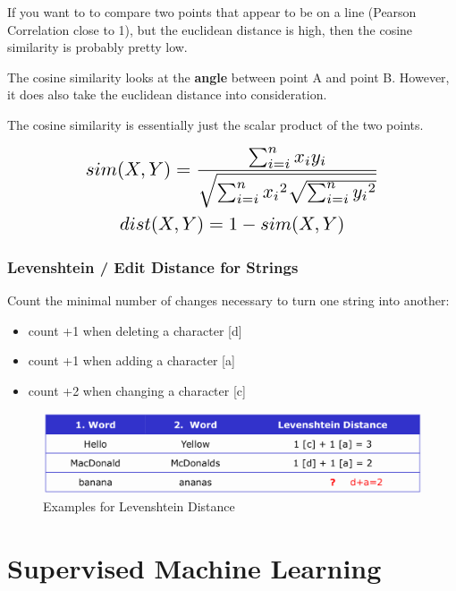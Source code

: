 \documentclass[a4paper, 11pt]{article}
\begin{document}
If you want to to compare two points that appear to be on a line (Pearson Correlation close to 1), but the euclidean distance is high, then the cosine similarity is probably pretty low. 

The cosine similarity looks at the \textbf{angle} between point A and point B. However, it does also take the euclidean distance into consideration.

\vspace{10px}

The cosine similarity is essentially just the scalar product of the two points.

\vspace{10px}

\[\scalebox{1.5}{
        $sim(X,Y) = \dfrac{\sum^{n}_{i=i}{x_{i} y_{i}}}{\sqrt{\sum^{n}_{i=i}{x_{i}}^2\sqrt{\sum^{n}_{i=i}{y_{i}}^2}}}$
}\]
\[\scalebox{1.5}{
        $dist(X,Y) = 1 - sim(X,Y)$
}\]

\subsubsection{Levenshtein / Edit Distance for Strings}

Count the minimal number of changes necessary to turn one string into another:
\begin{itemize}
    \item count +1 when deleting a character [d]
    \item count +1 when adding a character [a]
    \item count +2 when changing a character [c]
\end{itemize}

\begin{figure}[htb!]
    \centering
    \includegraphics[keepaspectratio=true, width=\linewidth]{levenshtein.png}
    \caption{Examples for Levenshtein Distance}
    \label{fig:levenshtein}
\end{figure}

\newpage

\section{Supervised Machine Learning}
\end{document}
